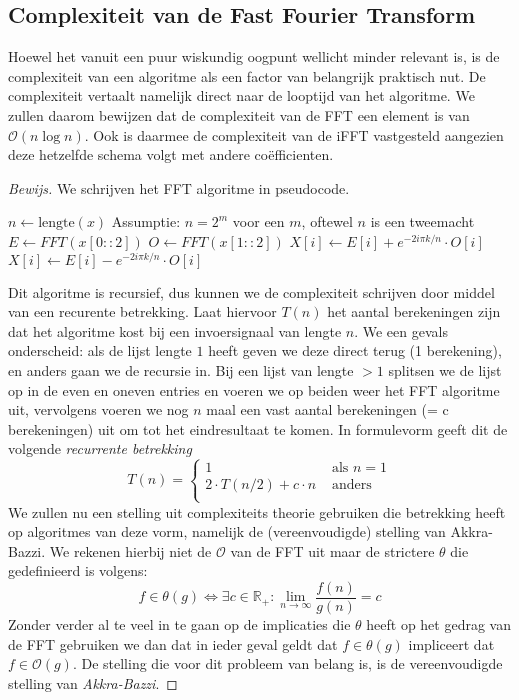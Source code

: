 \documentclass[11pt]{amsart}
\newcommand{\R}{\mathbb{R}}
\renewcommand{\O}{\mathcal{O}}
\theoremstyle{remark}
\begin{document}
\subsection*{Complexiteit van de Fast Fourier Transform}
Hoewel het vanuit een puur wiskundig oogpunt wellicht minder relevant is, is de complexiteit van een algoritme 
als een factor van belangrijk praktisch nut. De complexiteit vertaalt namelijk direct naar 
de looptijd van het algoritme. We zullen daarom bewijzen dat de complexiteit van de FFT 
een element is van $\O(n \log n)$. Ook is daarmee de complexiteit van de iFFT vastgesteld aangezien deze hetzelfde schema volgt met andere co\"efficienten. 

\begin{proof}[Bewijs]
We schrijven het FFT algoritme in pseudocode.

\begin{algorithmic}
\State $n \gets \text{lengte}(x)$ \Comment Assumptie: $n = 2^m$ voor een $m$, oftewel $n$ is een tweemacht
\Else
	\State $E \gets FFT(x[0::2])$ 
	\State $O \gets FFT(x[1::2])$ 
			\State $X[i] \gets E[i] + e^{-2i \pi k/n} \cdot O[i]$
		\Else
			\State $X[i] \gets E[i] - e^{-2i \pi k/n} \cdot O[i]$
		\EndIf
	\EndFor
\EndIf
\State {}
\EndFunction
\end{algorithmic}

Dit algoritme is recursief, dus kunnen we de complexiteit schrijven door middel van een recurente betrekking. Laat hiervoor $T(n)$ het aantal berekeningen zijn dat het algoritme kost bij een invoersignaal van lengte $n$. We een gevals onderscheid: als de lijst lengte $1$ heeft geven we deze direct terug (1 berekening), en anders gaan we de recursie in. Bij een lijst van lengte $>1$ splitsen we de lijst op in de even en oneven entries en voeren we op beiden weer het FFT algoritme uit, vervolgens voeren we nog $n$ maal een vast aantal berekeningen (= c berekeningen) uit om tot het eindresultaat te komen. In formulevorm geeft dit de volgende \emph{recurrente betrekking}
\[
T(n) = \begin{cases}
    1 &\text{ als } n = 1 \\
      2\cdot T(n/2) + c\cdot n &\text{ anders} \\
\end{cases}
\]
We zullen nu een stelling uit complexiteits theorie gebruiken die betrekking heeft op algoritmes van deze vorm, namelijk de (vereenvoudigde) stelling van Akkra-Bazzi. We rekenen hierbij niet de $\O$ van de FFT uit maar de strictere $\theta$ die gedefinieerd is volgens:
\[
f \in \theta(g) \Leftrightarrow \exists c \in \R_+: \lim_{n \to \infty} \frac{f(n)}{g(n)} = c
\]
Zonder verder al te veel in te gaan op de implicaties die $\theta$ heeft op het gedrag van de FFT gebruiken we dan dat in ieder geval geldt dat $f \in \theta(g)$ impliceert dat $f \in \O(g)$. 
De stelling die voor dit probleem van belang is, is de vereenvoudigde stelling van \emph{Akkra-Bazzi}.


\end{proof}
\end{document}

